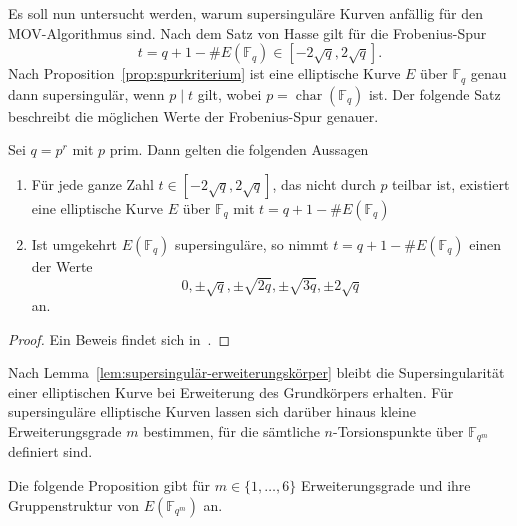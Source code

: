 Es soll nun untersucht werden, warum supersinguläre Kurven anfällig für den MOV-Algorithmus sind. Nach dem Satz von Hasse gilt für die Frobenius-Spur
\[
t=q+1-\#E(\mathbb{F}_q) \in [-2\sqrt{q},2\sqrt{q}].
\]
Nach Proposition~\ref{prop:spurkriterium} ist eine elliptische Kurve $E$ über $\mathbb{F}_q$ genau dann supersingulär, wenn $p\mid t$ gilt, wobei $p=\operatorname{char}(\mathbb{F}_q)$ ist. Der folgende Satz beschreibt die möglichen Werte der Frobenius-Spur genauer.
\begin{satz}
    Sei $q=p^r$ mit $p$ prim. Dann gelten die folgenden Aussagen
\begin{enumerate}
    \item Für jede ganze Zahl $t\in [-2\sqrt{q},2\sqrt{q}]$, das nicht durch $p$ teilbar ist, existiert eine elliptische Kurve $E$ über $\mathbb{F}_q$ mit $t=q+1-\#E(\mathbb{F}_q)$
    \item Ist umgekehrt $E(\mathbb{F}_q)$ supersinguläre, so nimmt $t=q+1-\#E(\mathbb{F}_q)$ einen der Werte 
    \[
    0,\pm\sqrt{q},\pm\sqrt{2q},\pm\sqrt{3q},\pm2\sqrt{q}
    \]
    an.
\end{enumerate}
\end{satz}
\begin{proof}
    Ein Beweis findet sich in~\cite[Theorem 4.1, S.~536]{waterhouse69}.
\end{proof}

Nach Lemma~\ref{lem:supersingulär-erweiterungskörper} bleibt die Supersingularität einer elliptischen Kurve bei Erweiterung des Grundkörpers erhalten. Für supersinguläre elliptische Kurven lassen sich darüber hinaus kleine Erweiterungsgrade $m$ bestimmen, für die sämtliche $n$-Torsionspunkte über $\mathbb{F}_{q^m}$ definiert sind.

Die folgende Proposition gibt für $m\in\{1,\dots,6\}$ Erweiterungsgrade und ihre Gruppenstruktur von $E(\mathbb{F}_{q^m})$ an.

